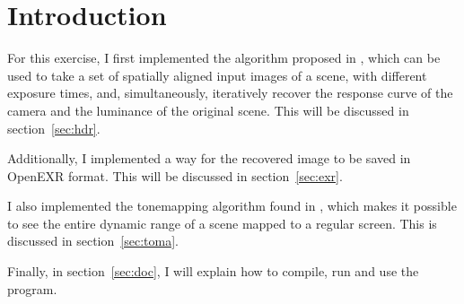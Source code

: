 \section{Introduction}\label{sec:intro}

For this exercise, I first implemented the algorithm proposed in \cite{rbs99},
which can be used to take a set of spatially aligned input images of a scene,
with different exposure times, and, simultaneously, iteratively recover the
response curve of the camera and the luminance of the original scene. This will
be discussed in section~\ref{sec:hdr}.

Additionally, I implemented a way for the recovered image to be saved in
OpenEXR format. This will be discussed in section~\ref{sec:exr}.

I also implemented the tonemapping algorithm found in \cite{dmac03},
which makes it possible to see the entire dynamic range of a scene mapped to a
regular screen. This is discussed in section~\ref{sec:toma}.

Finally, in section~\ref{sec:doc}, I will explain how to compile, run and use
the program.
